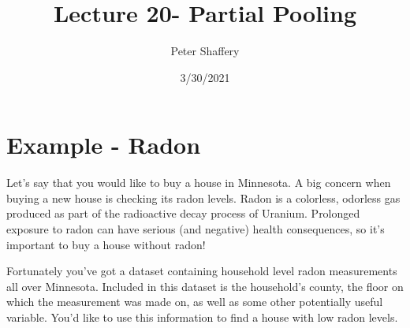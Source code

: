 \documentclass[
]{article}
\title{Lecture 20- Partial Pooling}
\author{Peter Shaffery}
\date{3/30/2021}
\newenvironment{Shaded}{\begin{snugshade}}{\end{snugshade}}
\newcommand{\FloatTok}[1]{\textcolor[rgb]{0.00,0.00,0.81}{#1}}
\newcommand{\FunctionTok}[1]{\textcolor[rgb]{0.00,0.00,0.00}{#1}}
\newcommand{\NormalTok}[1]{#1}
\newcommand{\OtherTok}[1]{\textcolor[rgb]{0.56,0.35,0.01}{#1}}
\newcommand{\SpecialCharTok}[1]{\textcolor[rgb]{0.00,0.00,0.00}{#1}}
\newcommand{\StringTok}[1]{\textcolor[rgb]{0.31,0.60,0.02}{#1}}
\begin{document}
\maketitle

\hypertarget{example---radon}{%
\section{Example - Radon}\label{example---radon}}

Let's say that you would like to buy a house in Minnesota. A big concern
when buying a new house is checking its radon levels. Radon is a
colorless, odorless gas produced as part of the radioactive decay
process of Uranium. Prolonged exposure to radon can have serious (and
negative) health consequences, so it's important to buy a house without
radon!

Fortunately you've got a dataset containing household level radon
measurements all over Minnesota. Included in this dataset is the
household's county, the floor on which the measurement was made on, as
well as some other potentially useful variable. You'd like to use this
information to find a house with low radon levels.

\begin{Shaded}
\end{Shaded}
\end{document}
